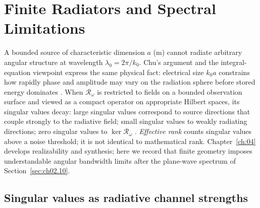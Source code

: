 
\section{Finite Radiators and Spectral Limitations}
\label{sec:ch02.7}

A bounded source of characteristic dimension $a$ (m) cannot radiate arbitrary angular structure at wavelength $\lambda_0=2\pi/k_0$. Chu’s argument and the integral-equation viewpoint express the same physical fact: electrical size $k_0 a$ constrains how rapidly phase and amplitude may vary on the radiation sphere before stored energy dominates \cite{chu1948,harrington2001}. When $\mathcal{R}_\omega$ is restricted to fields on a bounded observation surface and viewed as a compact operator on appropriate Hilbert spaces, its singular values decay: large singular values correspond to source directions that couple strongly to the radiative field; small singular values to weakly radiating directions; zero singular values to $\ker\mathcal{R}_\omega$ \cite{stratton1941}. \emph{Effective rank} counts singular values above a noise threshold; it is not identical to mathematical rank. Chapter~\ref{ch:04} develops realizability and synthesis; here we record that finite geometry imposes understandable angular bandwidth limits after the plane-wave spectrum of Section~\ref{sec:ch02.10}.

\subsection{Singular values as radiative channel strengths}
\label{sec:ch02.7.1}

